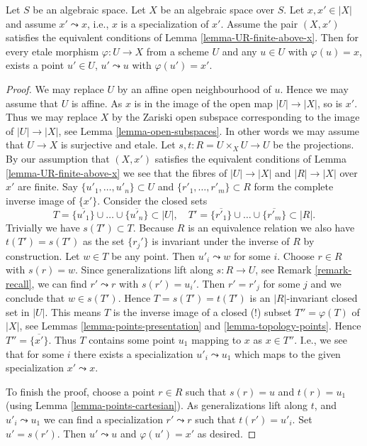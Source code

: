 \begin{lemma}
\label{lemma-specialization}
Let $S$ be an algebraic space.
Let $X$ be an algebraic space over $S$.
Let $x, x' \in |X|$ and assume $x' \leadsto x$, i.e., $x$ is a
specialization of $x'$.
Assume the pair $(X, x')$ satisfies the equivalent conditions
of Lemma \ref{lemma-UR-finite-above-x}. Then
for every etale morphism $\varphi : U \to X$ from a scheme $U$ and any
$u \in U$ with $\varphi(u) = x$, exists a point $u'\in U$,
$u' \leadsto u$ with $\varphi(u') = x'$.
\end{lemma}

\begin{proof}
We may replace $U$ by an affine open neighbourhood of $u$.
Hence we may assume that $U$ is affine. As $x$ is in the
image of the open map $|U| \to |X|$, so is $x'$. Thus we may
replace $X$ by the Zariski open subspace corresponding to
the image of $|U| \to |X|$, see
Lemma \ref{lemma-open-subspaces}.
In other words we may assume that
$U \to X$ is surjective and etale.
Let $s, t : R = U \times_X U \to U$ be the projections.
By our assumption that $(X, x')$ satisfies the equivalent conditions
of Lemma \ref{lemma-UR-finite-above-x} we see that the fibres
of $|U| \to |X|$ and $|R| \to |X|$
over $x'$ are finite. Say $\{u'_1, \ldots, u'_n\} \subset U$ and
$\{r'_1, \ldots, r'_m\} \subset R$ form the complete inverse image
of $\{x'\}$.
Consider the closed sets
$$
T = \overline{\{u'_1\}} \cup \ldots \cup \overline{\{u'_n\}} \subset |U|,
\quad
T' = \overline{\{r'_1\}} \cup \ldots \cup \overline{\{r'_m\}} \subset |R|.
$$
Trivially we have $s(T') \subset T$. Because $R$ is an equivalence
relation we also have $t(T') = s(T')$ as the set $\{r_j'\}$
is invariant under the inverse of $R$ by construction. Let $w \in T$
be any point. Then $u'_i \leadsto w$ for some $i$. Choose $r \in R$
with $s(r) = w$. Since generalizations lift along $s : R \to U$, see
Remark \ref{remark-recall}, we can find $r' \leadsto r$ with
$s(r') = u_i'$. Then $r' = r'_j$ for some $j$ and we conclude that
$w \in s(T')$. Hence $T = s(T') = t(T')$ is an $|R|$-invariant closed
set in $|U|$. This means $T$ is the inverse image of a closed (!)
subset $T'' = \varphi(T)$ of $|X|$, see
Lemmas \ref{lemma-points-presentation} and \ref{lemma-topology-points}.
Hence $T'' = \overline{\{x'\}}$.
Thus $T$ contains some point $u_1$ mapping to $x$ as $x \in T''$.
I.e., we see that for some $i$ there exists a specialization
$u'_i \leadsto u_1$ which maps to the given specialization
$x' \leadsto x$.

\medskip\noindent
To finish the proof, choose a point $r \in R$ such that
$s(r) = u$ and $t(r) = u_1$ (using Lemma \ref{lemma-points-cartesian}).
As generalizations lift along $t$, and $u'_i \leadsto u_1$
we can find a specialization $r' \leadsto r$ such that $t(r') = u'_i$.
Set $u' = s(r')$. Then $u' \leadsto u$ and $\varphi(u') = x'$ as
desired.
\end{proof}

